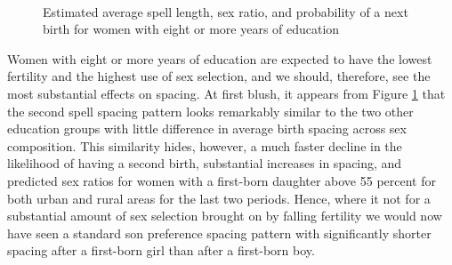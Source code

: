 \documentclass[12pt,letterpaper]{article}
\begin{document}
\begin{figure}[htpb]
\centering
{}
\\
\caption{Estimated average spell length, sex ratio, and probability of 
a next birth for women with eight or more years of education}
\label{fig:bootstrap_high}
\end{figure}


Women with eight or more years of education are expected to have the lowest fertility and 
the highest use of sex selection, and we should, therefore, see the most substantial 
effects on spacing.
At first blush, it appears from Figure \ref{fig:bootstrap_high} that the second spell 
spacing pattern looks remarkably similar to the two other education groups with little 
difference in average birth spacing across sex composition.
This similarity hides, however, a much faster decline in the likelihood of having a second 
birth, substantial increases in spacing, and predicted sex ratios for women with a 
first-born daughter above 55 percent for both urban and rural areas for the last two 
periods.
Hence, where it not for a substantial amount of sex selection brought on by falling
fertility we would now have seen a standard son preference spacing pattern with 
significantly shorter spacing after a first-born girl than after a first-born boy.
\end{document}
